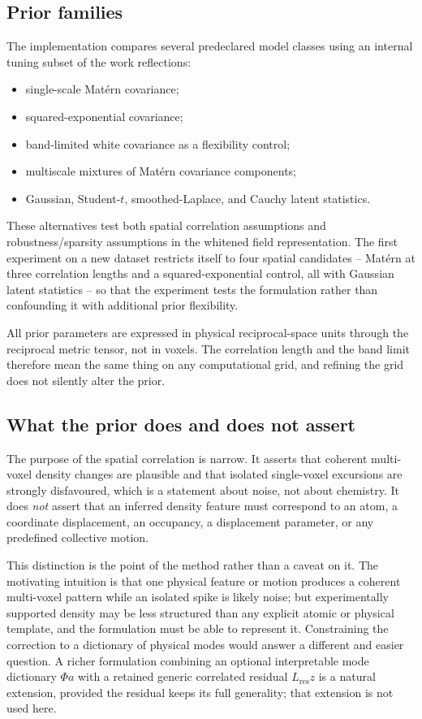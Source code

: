 \documentclass[11pt]{article}
\begin{document}
\subsection{Prior families}
The implementation compares several predeclared model classes using an internal tuning subset of the work reflections:
\begin{itemize}[nosep]
  \item single-scale Mat\'ern covariance;
  \item squared-exponential covariance;
  \item band-limited white covariance as a flexibility control;
  \item multiscale mixtures of Mat\'ern covariance components;
  \item Gaussian, Student-$t$, smoothed-Laplace, and Cauchy latent statistics.
\end{itemize}
These alternatives test both spatial correlation assumptions and robustness/sparsity assumptions in the whitened field representation. The first experiment on a new dataset restricts itself to four spatial candidates -- Mat\'ern at three correlation lengths and a squared-exponential control, all with Gaussian latent statistics -- so that the experiment tests the formulation rather than confounding it with additional prior flexibility.

All prior parameters are expressed in physical reciprocal-space units through the reciprocal metric tensor, not in voxels. The correlation length and the band limit therefore mean the same thing on any computational grid, and refining the grid does not silently alter the prior.

\subsection{What the prior does and does not assert}
The purpose of the spatial correlation is narrow. It asserts that coherent multi-voxel density changes are plausible and that isolated single-voxel excursions are strongly disfavoured, which is a statement about noise, not about chemistry. It does \emph{not} assert that an inferred density feature must correspond to an atom, a coordinate displacement, an occupancy, a displacement parameter, or any predefined collective motion.

This distinction is the point of the method rather than a caveat on it. The motivating intuition is that one physical feature or motion produces a coherent multi-voxel pattern while an isolated spike is likely noise; but experimentally supported density may be less structured than any explicit atomic or physical template, and the formulation must be able to represent it. Constraining the correction to a dictionary of physical modes would answer a different and easier question. A richer formulation combining an optional interpretable mode dictionary $\Phi a$ with a retained generic correlated residual $L_{\mathrm{res}}z$ is a natural extension, provided the residual keeps its full generality; that extension is not used here.
\end{document}
